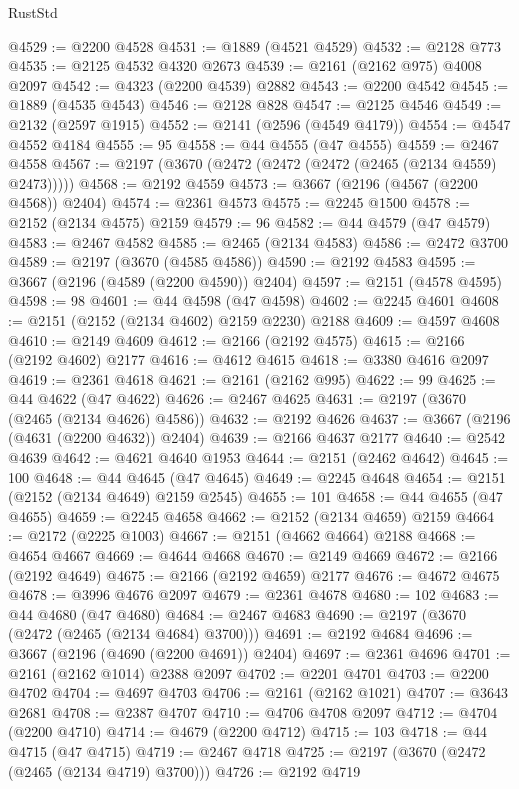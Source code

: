 \begin{lexlean}{RustStd}
\begin{coremodule}
@4529 := @2200 @4528
@4531 := @1889 (@4521 @4529)
@4532 := @2128 @773
@4535 := @2125 @4532 @4320 @2673
@4539 := @2161 (@2162 @975) @4008 @2097
@4542 := @4323 (@2200 @4539) @2882
@4543 := @2200 @4542
@4545 := @1889 (@4535 @4543)
@4546 := @2128 @828
@4547 := @2125 @4546
@4549 := @2132 (@2597 @1915)
@4552 := @2141 (@2596 (@4549 @4179))
@4554 := @4547 @4552 @4184
@4555 := 95
@4558 := @44 @4555 (@47 @4555)
@4559 := @2467 @4558
@4567 := @2197 (@3670 (@2472 (@2472 (@2472 (@2465 (@2134 @4559) @2473)))))
@4568 := @2192 @4559
@4573 := @3667 (@2196 (@4567 (@2200 @4568)) @2404)
@4574 := @2361 @4573
@4575 := @2245 @1500
@4578 := @2152 (@2134 @4575) @2159
@4579 := 96
@4582 := @44 @4579 (@47 @4579)
@4583 := @2467 @4582
@4585 := @2465 (@2134 @4583)
@4586 := @2472 @3700
@4589 := @2197 (@3670 (@4585 @4586))
@4590 := @2192 @4583
@4595 := @3667 (@2196 (@4589 (@2200 @4590)) @2404)
@4597 := @2151 (@4578 @4595)
@4598 := 98
@4601 := @44 @4598 (@47 @4598)
@4602 := @2245 @4601
@4608 := @2151 (@2152 (@2134 @4602) @2159 @2230) @2188
@4609 := @4597 @4608
@4610 := @2149 @4609
@4612 := @2166 (@2192 @4575)
@4615 := @2166 (@2192 @4602) @2177
@4616 := @4612 @4615
@4618 := @3380 @4616 @2097
@4619 := @2361 @4618
@4621 := @2161 (@2162 @995)
@4622 := 99
@4625 := @44 @4622 (@47 @4622)
@4626 := @2467 @4625
@4631 := @2197 (@3670 (@2465 (@2134 @4626) @4586))
@4632 := @2192 @4626
@4637 := @3667 (@2196 (@4631 (@2200 @4632)) @2404)
@4639 := @2166 @4637 @2177
@4640 := @2542 @4639
@4642 := @4621 @4640 @1953
@4644 := @2151 (@2462 @4642)
@4645 := 100
@4648 := @44 @4645 (@47 @4645)
@4649 := @2245 @4648
@4654 := @2151 (@2152 (@2134 @4649) @2159 @2545)
@4655 := 101
@4658 := @44 @4655 (@47 @4655)
@4659 := @2245 @4658
@4662 := @2152 (@2134 @4659) @2159
@4664 := @2172 (@2225 @1003)
@4667 := @2151 (@4662 @4664) @2188
@4668 := @4654 @4667
@4669 := @4644 @4668
@4670 := @2149 @4669
@4672 := @2166 (@2192 @4649)
@4675 := @2166 (@2192 @4659) @2177
@4676 := @4672 @4675
@4678 := @3996 @4676 @2097
@4679 := @2361 @4678
@4680 := 102
@4683 := @44 @4680 (@47 @4680)
@4684 := @2467 @4683
@4690 := @2197 (@3670 (@2472 (@2465 (@2134 @4684) @3700)))
@4691 := @2192 @4684
@4696 := @3667 (@2196 (@4690 (@2200 @4691)) @2404)
@4697 := @2361 @4696
@4701 := @2161 (@2162 @1014) @2388 @2097
@4702 := @2201 @4701
@4703 := @2200 @4702
@4704 := @4697 @4703
@4706 := @2161 (@2162 @1021)
@4707 := @3643 @2681
@4708 := @2387 @4707
@4710 := @4706 @4708 @2097
@4712 := @4704 (@2200 @4710)
@4714 := @4679 (@2200 @4712)
@4715 := 103
@4718 := @44 @4715 (@47 @4715)
@4719 := @2467 @4718
@4725 := @2197 (@3670 (@2472 (@2465 (@2134 @4719) @3700)))
@4726 := @2192 @4719

\end{coremodule}
\end{lexlean}
